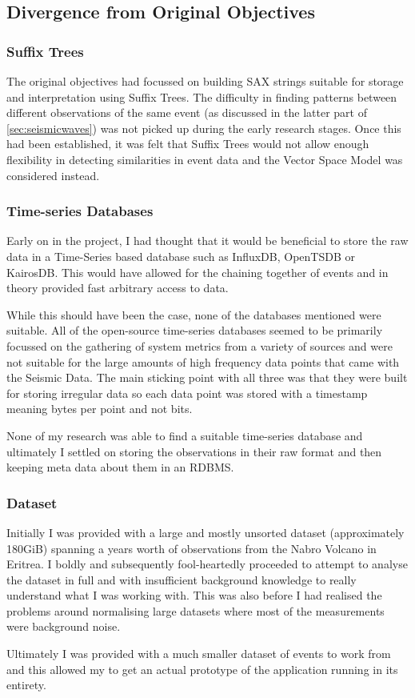 \documentclass[../report.tex]{subfiles}
\begin{document}
\subsection{Divergence from Original Objectives} \label{sec:alteration-objectives}
\subsubsection{Suffix Trees}
	The original objectives had focussed on building SAX strings suitable for storage and interpretation using Suffix Trees.  The difficulty in finding patterns between different observations of the same event (as discussed in the latter part of \cref{sec:seismicwaves}) was not picked up during the early research stages.  Once this had been established, it was felt that Suffix Trees would not allow enough flexibility in detecting similarities in event data and the Vector Space Model was considered instead.

\subsubsection{Time-series Databases}
	Early on in the project, I had thought that it would be beneficial to store the raw data in a Time-Series based database such as InfluxDB, OpenTSDB or KairosDB.  This would have allowed for the chaining together of events and in theory provided fast arbitrary access to data.
	
	While this should have been the case, none of the databases mentioned were suitable.  All of the open-source time-series databases seemed to be primarily focussed on the gathering of system metrics from a variety of sources and were not suitable for the large amounts of high frequency data points that came with the Seismic Data.  The main sticking point with all three was that they were built for storing irregular data so each data point was stored with a timestamp meaning bytes per point and not bits.
	
	None of my research was able to find a suitable time-series database and ultimately I settled on storing the observations in their raw format and then keeping meta data about them in an RDBMS.
	
\subsubsection{Dataset}
	Initially I was provided with a large and mostly unsorted dataset (approximately 180GiB) spanning a years worth of observations from the Nabro Volcano in Eritrea.  I boldly and subsequently fool-heartedly proceeded to attempt to analyse the dataset in full and with insufficient background knowledge to really understand what I was working with.  This was also before I had realised the problems around normalising large datasets where most of the measurements were background noise.
	
	Ultimately I was provided with a much smaller dataset of events to work from and this allowed my to get an actual prototype of the application running in its entirety.
	
\end{document}

